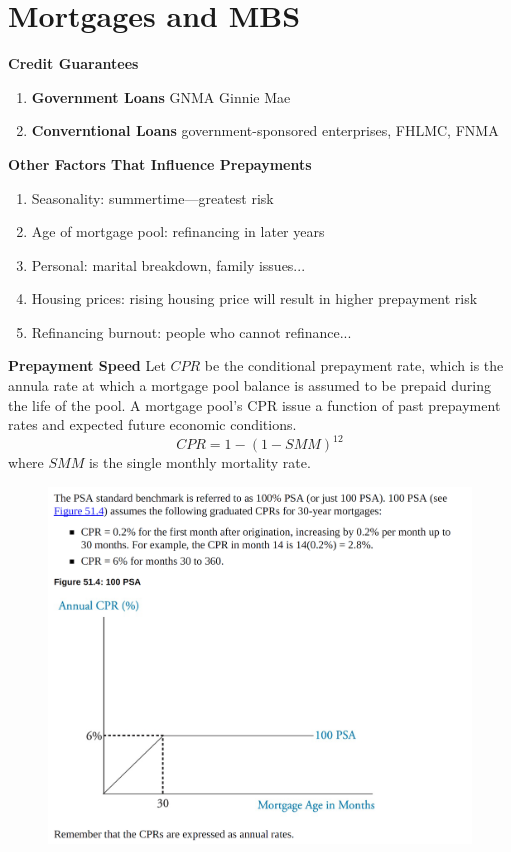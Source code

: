 \documentclass[11pt,fleqn]{book} %
\numberwithin{equation}{section} %
\numberwithin{figure}{section} %
\numberwithin{table}{section} %
\begin{document}
\chapter{Mortgages and MBS}
 \begin{definition}\textbf{Credit Guarantees}
    \begin{enumerate}
        \item \textbf{Government Loans} GNMA Ginnie Mae
        \item \textbf{Converntional Loans} government-sponsored enterprises, FHLMC, FNMA
    \end{enumerate}
 \end{definition}
 \begin{definition}\textbf{Other Factors That Influence Prepayments}
    \begin{enumerate}
        \item Seasonality: summertime---greatest risk
        \item Age of mortgage pool: refinancing in later years
        \item Personal: marital breakdown, family issues... 
        \item Housing prices: rising housing price will result in higher prepayment risk
        \item Refinancing burnout: people who cannot refinance... 
    \end{enumerate}
 \end{definition}
 \begin{definition}\textbf{Prepayment Speed}
    Let $CPR$ be the conditional prepayment rate, which is the annula rate at which a mortgage
    pool balance is assumed to be prepaid during the life of the pool. A mortgage pool's CPR issue
    a function of past prepayment rates and expected future economic conditions.
    $$
    CPR=1-(1-SMM)^12
    $$
    where $SMM$ is the single monthly mortality rate.
 \end{definition}
 \begin{figure}[h!]
    \centering
    \includegraphics[scale=0.6]{PSA.png}
 \end{figure}
 
\end{document}
